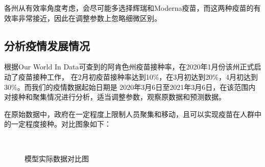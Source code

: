 \documentclass{cumcmthesis}
\begin{document}
各州从有效率角度考虑，会尽可能多选择辉瑞和Moderna疫苗，而这两种疫苗的有效率非常接近，因此在调整参数上忽略细微区别。

\clearpage
\subsection{分析疫情发展情况}
根据Our World In Data可查到的阿肯色州疫苗接种率，在2020年1月份该州正式启动了疫苗接种工作，
在2月初疫苗接种率达到10\%，在3月初达到20\%，4月初达到30\%。而我们的疫情数据起始日期是
2020年3月6日至2021年3月6日，在该范围内对接种和聚集情况进行分析，适当调整参数，观察原数据和预测数据。

在原始数据中，政府在一定程度上限制人员聚集和移动，且可以实现疫苗在人群中的一定程度接种。对比图象如下：
\begin{figure}[!htb]
    \centering
    \hfill
     \\
    \hfill
    \caption{模型实际数据对比图}
\end{figure}
\end{document}

